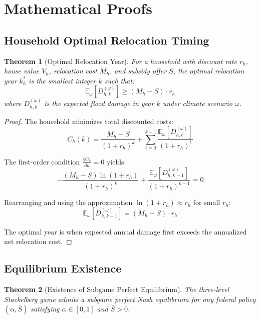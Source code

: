 \documentclass[preprint,12pt,authoryear]{elsarticle}
\newtheorem{theorem}{Theorem}
\begin{document}

\appendix

\section{Mathematical Proofs}\label{app:proofs}

\subsection{Household Optimal Relocation Timing}

\begin{theorem}[Optimal Relocation Year]
For a household with discount rate $r_h$, house value $V_h$, relocation cost $M_h$, and subsidy offer $S$, the optimal relocation year $k_h^*$ is the smallest integer $k$ such that:
\begin{equation}
\mathbb{E}_\omega[D_{h,k}^{(\omega)}] \geq (M_h - S) \cdot r_h
\end{equation}
where $D_{h,k}^{(\omega)}$ is the expected flood damage in year $k$ under climate scenario $\omega$.
\end{theorem}

\begin{proof}
The household minimizes total discounted costs:
\[
C_h(k) = \frac{M_h - S}{(1+r_h)^k} + \sum_{t=0}^{k-1} \frac{\mathbb{E}_\omega[D_{h,t}^{(\omega)}]}{(1+r_h)^t}
\]

The first-order condition $\frac{\partial C_h}{\partial k} = 0$ yields:
\[
-\frac{(M_h - S) \ln(1+r_h)}{(1+r_h)^k} + \frac{\mathbb{E}_\omega[D_{h,k-1}^{(\omega)}]}{(1+r_h)^{k-1}} = 0
\]

Rearranging and using the approximation $\ln(1+r_h) \approx r_h$ for small $r_h$:
\[
\mathbb{E}_\omega[D_{h,k-1}^{(\omega)}] = (M_h - S) \cdot r_h
\]

The optimal year is when expected annual damage first exceeds the annualized net relocation cost.
\end{proof}

\subsection{Equilibrium Existence}

\begin{theorem}[Existence of Subgame Perfect Equilibrium]
The three-level Stackelberg game admits a subgame perfect Nash equilibrium for any federal policy $(\alpha, \bar{S})$ satisfying $\alpha \in [0,1]$ and $\bar{S} > 0$.
\end{theorem}
\end{document}
